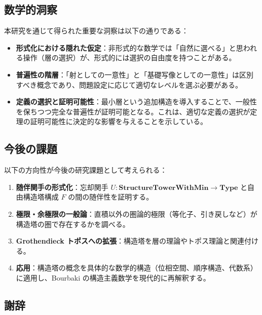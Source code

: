 \documentclass[a4paper,12pt]{ltjsarticle}
\theoremstyle{definition}
\begin{document}
\subsection{数学的洞察}

本研究を通じて得られた重要な洞察は以下の通りである：

\begin{itemize}
\item \textbf{形式化における隠れた仮定}：非形式的な数学では「自然に選べる」と思われる操作（層の選択）が、形式的には選択の自由度を持つことがある。

\item \textbf{普遍性の階層}：「射としての一意性」と「基礎写像としての一意性」は区別すべき概念であり、問題設定に応じて適切なレベルを選ぶ必要がある。

\item \textbf{定義の選択と証明可能性}：最小層という追加構造を導入することで、一般性を保ちつつ完全な普遍性が証明可能となる。これは、適切な定義の選択が定理の証明可能性に決定的な影響を与えることを示している。
\end{itemize}

\subsection{今後の課題}

以下の方向性が今後の研究課題として考えられる：

\begin{enumerate}
\item \textbf{随伴関手の形式化}：忘却関手 $U: \mathbf{StructureTowerWithMin} \to \mathbf{Type}$ と自由構造塔構成 $F$ の間の随伴性を証明する。

\item \textbf{極限・余極限の一般論}：直積以外の圏論的極限（等化子、引き戻しなど）が構造塔の圏で存在するかを調べる。

\item \textbf{Grothendieck トポスへの拡張}：構造塔を層の理論やトポス理論と関連付ける。

\item \textbf{応用}：構造塔の概念を具体的な数学的構造（位相空間、順序構造、代数系）に適用し、Bourbaki の構造主義数学を現代的に再解釈する。
\end{enumerate}

\subsection{謝辞}
\end{document}
